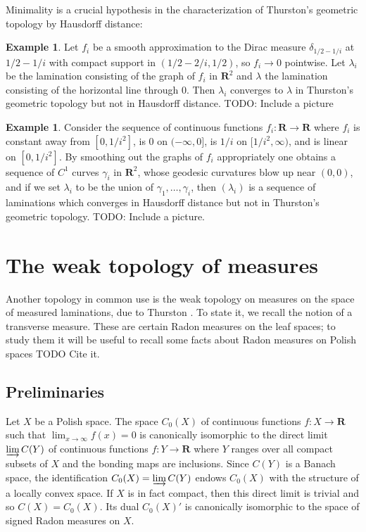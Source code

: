 \documentclass[reqno,10pt]{amsart}
\newcommand{\RR}{\mathbf{R}}
\theoremstyle{definition}
\newtheorem{example}[theorem]{Example}
\numberwithin{equation}{section}
\begin{document}
Minimality is a crucial hypothesis in the characterization of Thurston's geometric topology by Hausdorff distance:

\begin{example}
Let $f_i$ be a smooth approximation to the Dirac measure $\delta_{1/2-1/i}$ at $1/2 - 1/i$ with compact support in $(1/2 - 2/i, 1/2)$, so $f_i \to 0$ pointwise.
Let $\lambda_i$ be the lamination consisting of the graph of $f_i$ in $\RR^2$ and $\lambda$ the lamination consisting of the horizontal line through $0$.
Then $\lambda_i$ converges to $\lambda$ in Thurston's geometric topology but not in Hausdorff distance.
TODO: Include a picture
\end{example}

\begin{example}\label{Hausdorff does not imply Thurston}
Consider the sequence of continuous functions $f_i: \RR \to \RR$ where $f_i$ is constant away from $[0, 1/i^2]$, is $0$ on $(-\infty, 0]$, is $1/i$ on $[1/i^2, \infty)$, and is linear on $[0, 1/i^2]$.
By smoothing out the graphs of $f_i$ appropriately one obtains a sequence of $C^1$ curves $\gamma_i$ in $\RR^2$, whose geodesic curvatures blow up near $(0, 0)$, and if we set $\lambda_i$ to be the union of $\gamma_1, \dots, \gamma_i$, then $(\lambda_i)$ is a sequence of laminations which converges in Hausdorff distance but not in Thurston's geometric topology.
TODO: Include a picture.
\end{example}



\section{The weak topology of measures}
Another topology in common use is the weak topology on measures on the space of measured laminations, due to Thurston \cite[Chapter 8]{thurston1998minimal}.
To state it, we recall the notion of a transverse measure.
These are certain Radon measures on the leaf spaces; to study them it will be useful to recall some facts about Radon measures on Polish spaces TODO Cite it.

\subsection{Preliminaries}
Let $X$ be a Polish space.
The space $C_0(X)$ of continuous functions $f: X \to \RR$ such that $\lim_{x \to \infty} f(x) = 0$ is canonically isomorphic to the direct limit $\varinjlim C(Y)$ of continuous functions $f: Y \to \RR$ where $Y$ ranges over all compact subsets of $X$ and the bonding maps are inclusions.
Since $C(Y)$ is a Banach space, the identification $C_0(X) = \varinjlim C(Y)$ endows $C_0(X)$ with the structure of a locally convex space.
If $X$ is in fact compact, then this direct limit is trivial and so $C(X) = C_0(X)$.
Its dual $C_0(X)'$ is canonically isomorphic to the space of signed Radon measures on $X$.
\end{document}
